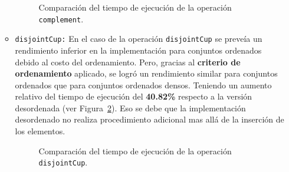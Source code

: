 \begin{itemize}
\begin{itemize}
        \begin{figure}[htbp]
          \centering
          \caption{Comparación del tiempo de ejecución de la operación \texttt{complement}.}
          \label{fig:Ren-Comp}
        \end{figure}

        \item \texttt{disjointCup:} 
        En el caso de la operación \texttt{disjointCup} se preveía un rendimiento inferior en la implementación para conjuntos ordenados debido al costo del ordenamiento. Pero, gracias al \textbf{criterio de ordenamiento} aplicado, se logró un rendimiento similar para conjuntos ordenados que para conjuntos ordenados densos. Teniendo un aumento relativo del tiempo de ejecución del \textbf{40{.}82\%} respecto a la versión desordenada (ver Figura~\ref{fig:Ren-dis}). Eso se debe que la implementación desordenado no realiza procedimiento adicional mas allá de la inserción de los elementos.

        \begin{figure}[htbp]
          \centering
          \caption{Comparación del tiempo de ejecución de la operación \texttt{disjointCup}.}
          \label{fig:Ren-dis}
        \end{figure}


\end{itemize}
\end{itemize}

